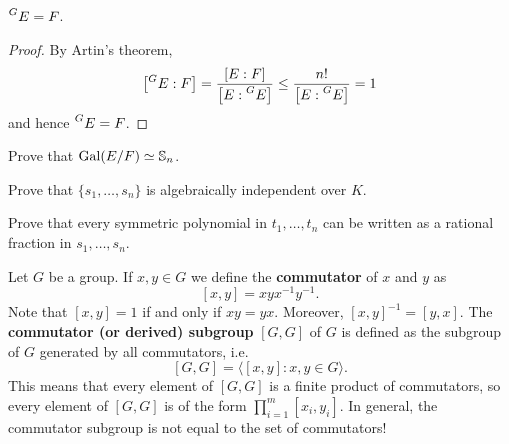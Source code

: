 \begin{theorem}
    $\prescript{G}{}{E}=F$.
\end{theorem}

\begin{proof}
    By Artin's theorem,
    \[
    \left[\prescript{G}{}{E}:F\right]=\frac{[E:F]}{\left[E:\prescript{G}{}{E}\right]}
    \leq\frac{n!}{\left[E:\prescript{G}{}{E}\right]}=1
    \]
    and hence $\prescript{G}{}{E}=F$.
\end{proof}

\begin{exercise}
    Prove that $\operatorname{Gal}(E/F)\simeq\mathbb{S}_n$.
\end{exercise}

\begin{exercise}
    Prove that $\{s_1,\dots,s_n\}$ is algebraically independent over $K$. 
\end{exercise}

\begin{exercise}
    Prove that every symmetric polynomial in $t_1,\dots,t_n$ can be written as a rational
    fraction in $s_1,\dots,s_n$. 
\end{exercise}


Let $G$ be a group. If $x,y\in G$ we define
the \textbf{commutator} of $x$ and $y$ as
\[
[x,y]=xyx^{-1}y^{-1}.
\]
Note that $[x,y]=1$ if and only if $xy=yx$. 
Moreover, $[x,y]^{-1}=[y,x]$. 
The
\textbf{commutator (or derived) subgroup} $[G,G]$ of $G$ is defined as
the subgroup of $G$ generated by all commutators, i.e. 
\[
[G,G]=\langle [x,y]:x,y\in G\rangle.
\]
This means that every element of $[G,G]$ is a finite product of commutators, 
so every element of $[G,G]$ is of the form $\prod_{i=1}^m [x_i,y_i]$. 
In general, the commutator subgroup is not equal to the set of commutators!

%
%
%
%
%
%
%
%   

